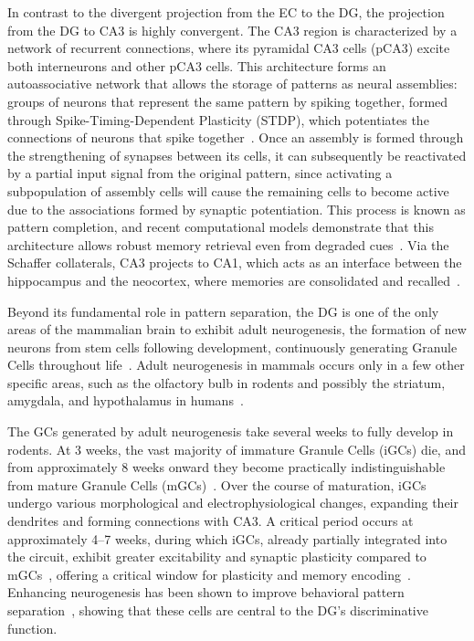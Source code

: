 In contrast to the divergent projection from the EC to the DG, the projection from the DG to CA3 is highly convergent. The CA3
region is characterized by a network of recurrent connections, where its pyramidal CA3 cells (pCA3) excite both interneurons and
other pCA3 cells. This architecture forms an autoassociative network that allows the storage of patterns as neural assemblies:
groups of neurons that represent the same pattern by spiking together, formed through Spike-Timing-Dependent Plasticity (STDP),
which potentiates the connections of neurons that spike together~\parencite{kopsickFormation2024}. Once an assembly is formed through
the strengthening of synapses between its cells, it can subsequently be reactivated by a partial input signal from the original
pattern, since activating a subpopulation of assembly cells will cause the remaining cells to become active due to the
associations formed by synaptic potentiation. This process is known as pattern completion, and recent computational models
demonstrate that this architecture allows robust memory retrieval even from degraded cues~\parencite{kopsickFormation2024,
leduigouRecurrent2014}. Via the Schaffer collaterals, CA3 projects to CA1, which acts as an interface between the hippocampus
and the neocortex, where memories are consolidated and recalled~\parencite{bartschCA12011}.

Beyond its fundamental role in pattern separation, the DG is one of the only areas of the mammalian brain to exhibit adult
neurogenesis, the formation of new neurons from stem cells following development, continuously generating Granule Cells throughout
life~\parencite{boldriniHuman2018, dumitruIdentification2025}. Adult neurogenesis in mammals occurs only in a few other specific
areas, such as the olfactory bulb in rodents and possibly the striatum, amygdala, and hypothalamus in
humans~\parencite{alonsoImpact2024, jurkowskiHippocampus2020}.

The GCs generated by adult neurogenesis take several weeks to fully develop in rodents. At 3 weeks, the vast majority of immature
Granule Cells (iGCs) die, and from approximately 8 weeks onward they become practically indistinguishable from mature Granule
Cells (mGCs)~\parencite{denoth-lippunerFormation2021}. Over the course of maturation, iGCs undergo various morphological and
electrophysiological changes, expanding their dendrites and forming connections with CA3. A critical period occurs at
approximately 4--7 weeks, during which iGCs, already partially integrated into the circuit, exhibit greater excitability and
synaptic plasticity compared to mGCs~\parencite{zhaoDistinct2006, denoth-lippunerFormation2021, aimoneRegulation2014}, offering a
critical window for plasticity and memory encoding~\parencite{berdugo-vegaSharpening2023}. Enhancing neurogenesis has been shown
to improve behavioral pattern separation~\parencite{sahayIncreasing2011}, showing that these cells are central to the DG's
discriminative function.

